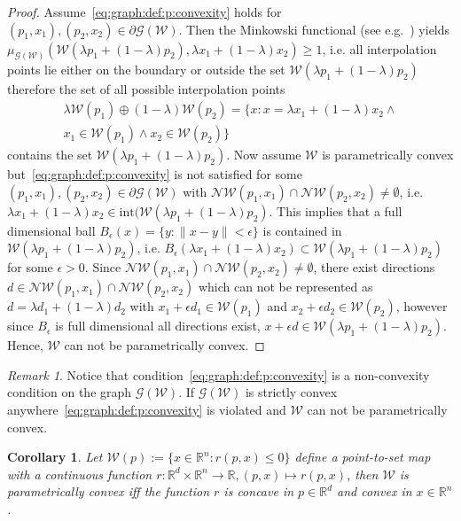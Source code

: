 \documentclass[journal]{IEEEtran}
\newcounter{thmcount}
\newtheorem{cor}[thmcount]{Corollary}
\theoremstyle{remark}
\newtheorem{rem}[thmcount]{Remark}
\theoremstyle{definition}
\begin{document}
\begin{proof}
%
Assume~\eqref{eq:graph:def:p:convexity} holds for $(p_1,x_1),(p_2,x_2)\in\partial\mathscr G(\mathcal W)$.
%
Then the Minkowski functional (see e.g.~\cite{Rudin:91}) yields $\mu_{\mathscr G(\mathcal W)}(\mathcal W(\lambda p_1 + (1-\lambda)p_2),
\lambda x_1+(1-\lambda)x_2)\geq1$,
i.e. all interpolation points lie either on the boundary or outside the set $\mathcal W(\lambda p_1+(1-\lambda)p_2)$
therefore the set of all possible interpolation points 
%
\[
\begin{split}
  \lambda \mathcal W(p_1)\oplus (1-\lambda)\mathcal W(p_2) = \{x:x=\lambda x_1 + (1-\lambda) x_2 \wedge\\ x_1\in\mathcal 
  W(p_1) \wedge x_2\in\mathcal W(p_2)\}
\end{split}
\]
%
contains the set $\mathcal W(\lambda p_1 + (1-\lambda)p_2)$.
%
Now assume $\mathcal W$ is parametrically convex but~\eqref{eq:graph:def:p:convexity} is not satisfied for 
some $(p_1,x_1),(p_2,x_2)\in\partial\mathscr G(\mathcal W)$ with $\mathcal N\mathcal W(p_1,x_1)\cap\mathcal 
N\mathcal W(p_2,x_2)\neq\emptyset$, i.e. $\lambda x_1 + (1-\lambda)x_2\in\text{int}(\mathcal W(\lambda p_1 + 
(1-\lambda)p_2)$.
%
This implies that a full dimensional ball $B_\epsilon(x ) = \{y:\| 
x-y\|<\epsilon\}$
is contained in $\mathcal W(\lambda p_1 + (1-\lambda)p_2)$, i.e. $B_\epsilon(\lambda x_1 + (1-\lambda)x_2 )\subset
\mathcal W(\lambda p_1 + (1-\lambda)p_2)$ for some $\epsilon>0$.
%
Since $\mathcal N\mathcal W(p_1,x_1)\cap\mathcal N\mathcal W(p_2,x_2)\neq\emptyset$, there exist directions 
$d\in\mathcal N\mathcal W(p_1,x_1)\cap\mathcal N\mathcal W(p_2,x_2)$ which can not be represented as $d=\lambda d_1+
(1-\lambda)d_2$ with $x_1 + \epsilon d_1\in\mathcal W(p_1)$ and $x_2  + \epsilon d_2\in\mathcal W(p_2)$, however since $B_\epsilon$ is full dimensional
all directions exist, $x+\epsilon d\in\mathcal W(\lambda p_1 + (1-\lambda)p_2)$.
%
Hence, $\mathcal W$ can not be parametrically convex.
\end{proof}
%
\begin{rem}
Notice that condition~\eqref{eq:graph:def:p:convexity} is a non-convexity condition on the graph $\mathscr G(\mathcal W)$.
%
If $\mathscr G(\mathcal W)$ is strictly convex anywhere~\eqref{eq:graph:def:p:convexity} is violated and 
$\mathcal W$ can not be parametrically convex.
\end{rem}
%
\begin{cor}
%
Let $\mathcal W(p):=\{x\in\mathbb R^n: r(p,x)\leq0\}$ define a point-to-set
map with a continuous function 
$r: \mathbb R^d \times\mathbb R^n \rightarrow \mathbb R,(p,x)\mapsto r(p,x)$, 
then $\mathcal W$ is parametrically
convex iff the function $r$ is concave in $p\in\mathbb R^d$ and convex in $x\in
\mathbb R^n$.
%
\end{cor}
\end{document}
